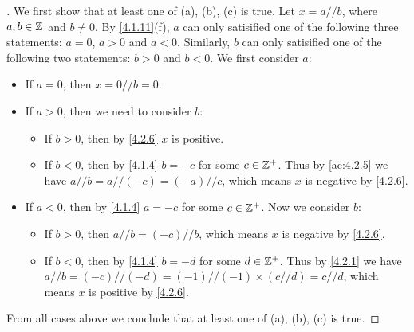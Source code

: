 \begin{proof}[]
  We first show that at least one of (a), (b), (c) is true.
  Let \(x = a // b\), where \(a, b \in \mathbb{Z}\) and \(b \neq 0\).
  By \cref{4.1.11}(f), \(a\) can only satisified one of the following three statements:
  \(a = 0\), \(a > 0\) and \(a < 0\).
  Similarly, \(b\) can only satisified one of the following two statements:
  \(b > 0\) and \(b < 0\).
  We first consider \(a\):
  \begin{itemize}
    \item If \(a = 0\), then \(x = 0 // b = 0\).
    \item If \(a > 0\), then we need to consider \(b\):
          \begin{itemize}
            \item If \(b > 0\), then by \cref{4.2.6} \(x\) is positive.
            \item If \(b < 0\), then by \cref{4.1.4} \(b = -c\) for some \(c \in \mathbb{Z}^+\).
                  Thus by \cref{ac:4.2.5} we have \(a // b = a // (-c) = (-a) // c\), which means \(x\) is negative by \cref{4.2.6}.
          \end{itemize}
    \item If \(a < 0\), then by \cref{4.1.4} \(a = -c\) for some \(c \in \mathbb{Z}^+\).
          Now we consider \(b\):
          \begin{itemize}
            \item If \(b > 0\), then \(a // b = (-c) // b\), which means \(x\) is negative by \cref{4.2.6}.
            \item If \(b < 0\), then by \cref{4.1.4} \(b = -d\) for some \(d \in \mathbb{Z}^+\).
                  Thus by \cref{4.2.1} we have \(a // b = (-c) // (-d) = (-1) // (-1) \times (c // d) = c // d\), which means \(x\) is positive by \cref{4.2.6}.
          \end{itemize}
  \end{itemize}
  From all cases above we conclude that at least one of (a), (b), (c) is true.


\end{proof}
